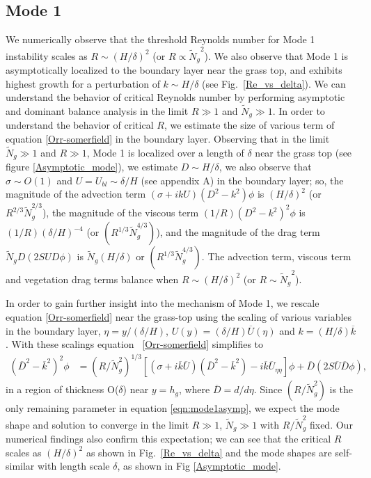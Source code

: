 \documentclass[12pt]{report}   %
\newcommand{\hg}{h_g}
\newcommand{\Rey}{{R}}
\newcommand{\Ndg}{\tilde{N}_g}
\renewcommand{\bar}{\overline}
\begin{document}
\subsection{Mode 1}
We numerically observe that the threshold Reynolds number for Mode 1 instability scales as  $\Rey \sim (H/\delta)^2$ (or $\Rey \propto {\Ndg}^{2}$). We also observe that Mode 1 is asymptotically localized to the boundary layer near the grass top, and exhibits highest growth for a perturbation of $k \sim H/\delta$ (see Fig.~\ref{Re_vs_delta}). We can understand the behavior of critical Reynolds number by performing asymptotic and dominant balance analysis in the limit $\Rey \gg 1$ and $\Ndg \gg 1$. In order to understand the behavior of critical $\Rey$, we estimate the size of various term of equation \eqref{Orr-somerfield} in the boundary layer. Observing that in the limit $\Ndg \gg 1$ and $\Rey \gg 1$, Mode 1 is localized over a length of $\delta$ near the grass top (see figure \ref{Asymptotic_mode}), we estimate $D \sim H/\delta$, we also observe that $\sigma \sim O(1)$ and $U = U_{bl} \sim \delta/H$ (see appendix A) in the boundary layer; so, the magnitude of the advection term $\left(\sigma + i k U\right)\left(
D^2-
k^2\right) \phi$ is $ (H/\delta)^2$  (or $\Rey^{2/3} \Ndg^{2/3}$), the magnitude of the viscous term $(1/\Rey)\left(D^2-k^2\right)^2\phi$ is $(1/\Rey) (\delta/H)^{-4}$ (or $(\Rey^{1/3} \Ndg^{4/3})$), and the magnitude of the drag term $\Ndg D \left( 2 S U D \phi \right)$ is $\Ndg(H/\delta)$ or $(\Rey^{1/3} \Ndg^{4/3})$.
The advection term, viscous term and vegetation drag terms balance when $\Rey \sim (H/\delta)^2$ (or $\Rey \sim {\Ndg}^{2}$). 




In order to gain further insight into the mechanism of Mode 1, we rescale equation \eqref{Orr-somerfield} near the grass-top using the scaling of various variables in the boundary layer, $\eta = y/(\delta/H)$, 
$U(y) = (\delta/H)\bar{U}(\eta)$ and $k = (H/\delta) \bar{k}$.
With these scalings equation ~\eqref{Orr-somerfield} simplifies to
\begin{equation}
\begin{split}
\left(\bar{D}^2 -\bar{k}^{2} \right)^2\phi &= (\Rey/\Ndg^2)^{1/3} \left[ \left({\sigma}+i\bar{k}\bar{U}\right) \left(\bar{D}^2-\bar{k}^2\right) -i\bar{k}\bar{U}_{\eta\eta}\right]\phi + \bar{D}\left(2S \bar{U} \bar{D} \phi\right),
\label{eqn:mode1asymp}
\end{split}
\end{equation}
in a region of thickness O($\delta$) near $y=\hg$, where $\bar{D} = d/d\eta$. 
Since $(\Rey/\Ndg^2)$ is the only remaining parameter in equation \eqref{eqn:mode1asymp}, we expect the mode shape and solution to converge in the limit $\Rey \gg 1$, $\Ndg \gg 1$ with $\Rey/\Ndg^2$ fixed.
Our numerical findings also confirm this expectation; we can see that the critical $\Rey$ scales as $(H/\delta)^2$ as shown in Fig.~\ref{Re_vs_delta} and the mode shapes are self-similar with length scale $\delta$, as shown in Fig \ref{Asymptotic_mode}. 
\end{document}
